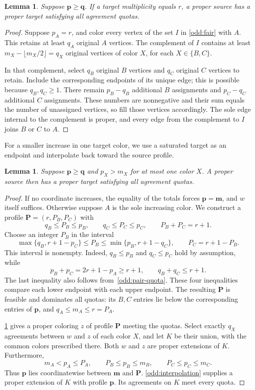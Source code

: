 \documentclass[11pt,reqno]{amsart}
\numberwithin{equation}{section}
\newtheorem{lemma}[theorem]{Lemma}
\theoremstyle{definition}
\theoremstyle{remark}
\begin{document}
\begin{lemma}\label{odd:saturated}
Suppose $\mathbf p\ge\mathbf q$. If a target multiplicity equals $r$,
a proper source has a proper
target satisfying all agreement quotas.
\end{lemma}
\begin{proof}
Suppose $p_A=r$, and color every vertex of the set $I$ in
\cref{odd:fair} with $A$. This retains at least $q_A$ original
$A$ vertices. The complement of $I$ contains at least
$m_X-\lfloor m_X/2\rfloor=q_X$ original vertices of color $X$,
for each $X\in\{B,C\}$.

In that complement, select $q_B$ original $B$ vertices and $q_C$
original $C$ vertices to retain. Include the corresponding endpoints
of its unique edge; this is possible because $q_B,q_C\ge1$.
There remain $p_B-q_B$ additional $B$ assignments and $p_C-q_C$
additional $C$ assignments. These numbers are nonnegative and their
sum equals the number of unassigned vertices, so fill those vertices
accordingly. The sole edge internal to the complement is proper, and
every edge from the complement to $I$ joins $B$ or $C$ to $A$.
\end{proof}

For a smaller increase in one target color, we use a saturated target
as an endpoint and interpolate back toward the source profile.

\begin{lemma}\label{odd:oneincrease}
Suppose $\mathbf p\ge\mathbf q$ and $p_X>m_X$ for at most one color $X$.
A proper source then
has a proper target satisfying all agreement quotas.
\end{lemma}
\begin{proof}
If no coordinate increases, the equality of the totals forces
$\mathbf p=\mathbf m$, and $w$ itself suffices. Otherwise suppose
$A$ is the sole increasing color. We construct a profile
$\mathbf P=(r,P_B,P_C)$ with
\[
q_B\le P_B\le p_B,\qquad
q_C\le P_C\le p_C,\qquad P_B+P_C=r+1.
\]
Choose an integer $P_B$ in the interval
\[
\max\{q_B,r+1-p_C\}
\le P_B\le
\min\{p_B,r+1-q_C\},
\qquad P_C=r+1-P_B.
\]
This interval is nonempty. Indeed, $q_B\le p_B$ and $q_C\le p_C$
hold by assumption, while
\[
p_B+p_C=2r+1-p_A\ge r+1,
\qquad q_B+q_C\le r+1.
\]
The last inequality also follows from~\eqref{odd:pair-quota}.
These four inequalities compare each lower endpoint with
each upper endpoint. The resulting $\mathbf P$ is feasible and
dominates all quotas: its $B,C$ entries lie below the corresponding
entries of $\mathbf p$, and $q_A\le m_A\le r=P_A$.

\cref{odd:saturated} gives a proper coloring $z$ of profile
$\mathbf P$ meeting the quotas. Select exactly $q_X$ agreements
between $w$ and $z$ of each color $X$, and let $K$ be their union,
with the common colors prescribed there. Both $w$ and $z$ are proper
extensions of $K$. Furthermore,
\[
m_A<p_A\le P_A,
\qquad P_B\le p_B\le m_B,
\qquad P_C\le p_C\le m_C.
\]
Thus $\mathbf p$ lies coordinatewise between $\mathbf m$ and
$\mathbf P$. \cref{odd:interpolation} supplies a proper
extension of $K$ with profile $\mathbf p$. Its agreements on $K$
meet every quota.
\end{proof}
\end{document}
